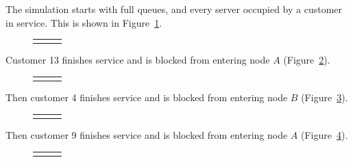 \documentclass{article}
\begin{document}
The simulation starts with full queues, and every server occupied by a customer in service. This is shown in Figure~\ref{fig:general_buildup_1}.

\begin{figure}[H]
  \begin{tabular}{ c c c }
       & \hspace{0.1\textwidth} &
       \\
  \end{tabular}
  \caption{}
  \label{fig:general_buildup_1}
\end{figure}

Customer 13 finishes service and is blocked from entering node $A$ (Figure~\ref{fig:general_buildup_2}).

\begin{figure}[H]
  \begin{tabular}{ c c c }
       & \hspace{0.1\textwidth} &
       \\
  \end{tabular}
  \caption{}
  \label{fig:general_buildup_2}
\end{figure}

Then customer 4 finishes service and is blocked from entering node $B$ (Figure~\ref{fig:general_buildup_3}).

\begin{figure}[H]
  \begin{tabular}{ c c c }
       & \hspace{0.1\textwidth} &
       \\
  \end{tabular}
  \caption{}
  \label{fig:general_buildup_3}
\end{figure}

Then customer 9 finishes service and is blocked from entering node $A$ (Figure~\ref{fig:general_buildup_4}).

\begin{figure}[H]
  \begin{tabular}{ c c c }
       & \hspace{0.1\textwidth} &
       \\
  \end{tabular}
  \caption{}
  \label{fig:general_buildup_4}
\end{figure}
\end{document}
